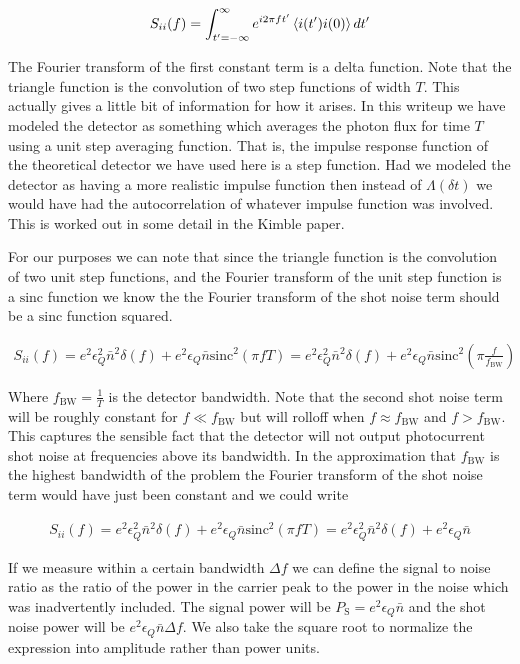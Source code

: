 \documentclass[12pt]{article}
\newcommand{\sinc}{\text{sinc}}
\begin{document}
\begin{align}
S_{ii}(f) = \int_{t'=-\infty}^{\infty} e^{i2\pi f t'} \Braket{i(t')i(0)} dt'
\end{align}

The Fourier transform of the first constant term is a delta function. 
Note that the triangle function is the convolution of two step functions of width $T$. This actually gives a little bit of information for how it arises. In this writeup we have modeled the detector as something which averages the photon flux for time $T$ using a unit step averaging function. That is, the impulse response function of the theoretical detector we have used here is a step function. Had we modeled the detector as having a more realistic impulse function then instead of $\Lambda(\delta t)$ we would have had the autocorrelation of whatever impulse function was involved. This is worked out in some detail in the Kimble paper.

For our purposes we can note that since the triangle function is the convolution of two unit step functions, and the Fourier transform of the unit step function is a $\sinc$ function we know the the Fourier transform of the shot noise term should be a $\sinc$ function squared.

\begin{align}
S_{ii}(f) = e^2 \epsilon_Q^2 \bar{n}^2 \delta(f) + e^2 \epsilon_Q \bar{n} \sinc^2(\pi f T) = e^2 \epsilon_Q^2 \bar{n}^2 \delta(f) + e^2 \epsilon_Q \bar{n} \sinc^2\left(\pi \frac{f}{f_{\text{BW}}}\right)
\end{align}

Where $f_{\text{BW}} = \frac{1}{T}$ is the detector bandwidth. Note that the second shot noise term will be roughly constant for $f \ll f_{\text{BW}}$ but will rolloff when $f \approx f_{\text{BW}}$ and $f>f_{\text{BW}}$. This captures the sensible fact that the detector will not output photocurrent shot noise at frequencies above its bandwidth. In the approximation that $f_{\text{BW}}$ is the highest bandwidth of the problem the Fourier transform of the shot noise term would have just been constant and we could write

\begin{align}
S_{ii}(f) = e^2 \epsilon_Q^2 \bar{n}^2 \delta(f) + e^2 \epsilon_Q \bar{n} \sinc^2(\pi f T) = e^2 \epsilon_Q^2 \bar{n}^2 \delta(f) + e^2 \epsilon_Q \bar{n}
\end{align}

If we measure within a certain bandwidth $\Delta f$ we can define the signal to noise ratio as the ratio of the power in the carrier peak to the power in the noise which was inadvertently included. The signal power will be $P_{\text{S}} = e^2 \epsilon_Q \bar{n}$ and the shot noise power will be $e^2 \epsilon_Q \bar{n} \Delta f$. We also take the square root to normalize the expression into amplitude rather than power units.
\end{document}
